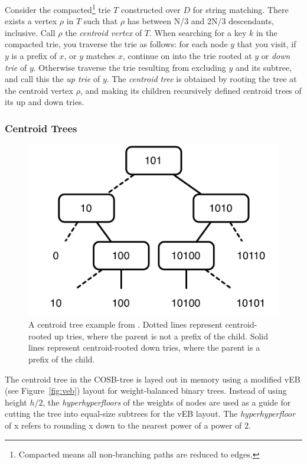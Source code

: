 \documentclass[preprint]{style}
\begin{document}
Consider the compacted\footnote{Compacted means all non-branching paths are
reduced to edges.} trie $T$ constructed over $D$ for string matching. There exists a
vertex $\rho$ in $T$ such that $\rho$ has between N/3 and 2N/3 descendants,
inclusive. Call $\rho$ the \emph{centroid vertex} of $T$. When searching for a
key $k$ in the compacted trie, you traverse the trie as follows: for each node
$y$ that you visit, if $y$ is a prefix of $x$, or $y$ matches $x$, continue on
into the trie rooted at $y$ or \emph{down trie} of $y$. Otherwise traverse the
trie resulting from excluding $y$ and its subtree, and call this the \emph{up trie} of $y$. The \emph{centroid tree} is
obtained by rooting the tree at the centroid vertex $\rho$, and making its
children recursively defined centroid trees of its up and down tries. 

\subsubsection{Centroid Trees} %
\begin{figure}
\begin{center}
	\includegraphics[width=0.8\columnwidth]{figures/centroidtreeexample.pdf}
\end{center}
\caption{A centroid tree example from \cite{BenderFaKu06}. Dotted lines
represent centroid-rooted up tries, where the parent is not a prefix of the
child. Solid lines represent centroid-rooted down tries, where the parent is a
prefix of the child.}
\label{fig:centroid}
\end{figure}


The centroid tree in the COSB-tree is layed out in memory using a modified vEB
(see Figure~\ref{fig:veb}) layout for weight-balanced binary trees. Instead of using height $h/2$, the
\emph{hyperhyperfloors} of the weights of nodes are used as a guide for cutting the tree into
equal-size subtrees for the vEB layout. The \emph{hyperhyperfloor} of x refers
to rounding x down to the nearest power of a power of 2.
\end{document}

